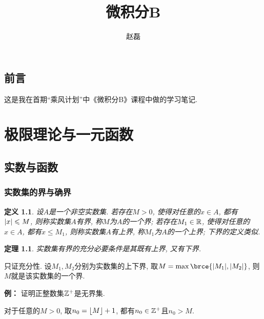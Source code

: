 \documentclass[a4paper,punct=CCT]{ctexbook}
\title{微积分B}
\author{赵磊}
\makeatletter
\theoremstyle{break}
\newtheorem*{theorem*}{定理}
\newtheorem*{definition*}{定义}
\renewenvironment{proof}[1][\proofname]{\par
  \pushQED{\qed}%
  \normalfont \topsep6\p@\@plus6\p@\relax
  \trivlist
  \item[]\ignorespaces
}{%
  \popQED\endtrivlist\@endpefalse
}
\newenvironment{example}[1][]{\noindent\textbf{例#1：}}{}
\let\leq\leqslant
\let\le\leq
\makeatother
\begin{document}
\frontmatter

\maketitle
\thispagestyle{empty}

\chapter*{前言}

这是我在首期“乘风计划”中《微积分B》课程中做的学习笔记.

\clearpage
\thispagestyle{empty}

\mainmatter

\part{极限理论与一元函数}

\chapter{实数与函数}

\section{实数集的界与确界}

\begin{definition*}
  设\(A\)是一个非空实数集.  若存在\(M > 0\), 使得对任意的\(x \in A\), 都有\(\abs{x} \le M\), 则称实数集\(A\)有界, 称\(M\)为\(A\)的一个界; 若存在\(M_1 \in \mathbb{R}\), 使得对任意的\(x \in A\), 都有\(x \le M_1\), 则称实数集\(A\)有上界, 称\(M_1\)为\(A\)的一个上界; 下界的定义类似.
\end{definition*}

\begin{theorem*}
  实数集有界的充分必要条件是其既有上界, 又有下界.
\end{theorem*}

\begin{proof}
  只证充分性.  设\(M_1, M_2\)分别为实数集的上下界, 取\(M = \max\brce{\abs{M_1}, \abs{M_2}}\), 则\(M\)就是该实数集的一个界.
\end{proof}

\begin{example}
  证明正整数集\(\mathbb{Z}^+\)是无界集.
\end{example}

\begin{proof}
  对于任意的\(M > 0\), 取\(n_0 = \lfloor M\rfloor + 1\), 都有\(n_0 \in \mathbb{Z}^+\)且\(n_0 > M\).
\end{proof}
\end{document}
